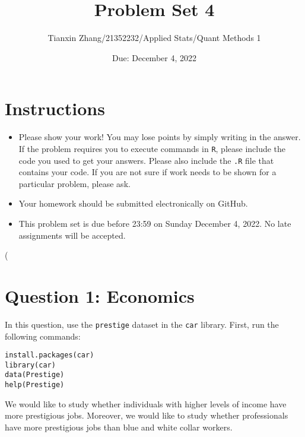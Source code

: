 \documentclass[12pt,letterpaper]{article}
\title{Problem Set 4}
\date{Due: December 4, 2022}
\author{Tianxin Zhang/21352232/Applied Stats/Quant Methods 1}
\begin{document}
	\maketitle
	\section*{Instructions}
	\begin{itemize}
		\item Please show your work! You may lose points by simply writing in the answer. If the problem requires you to execute commands in \texttt{R}, please include the code you used to get your answers. Please also include the \texttt{.R} file that contains your code. If you are not sure if work needs to be shown for a particular problem, please ask.
		\item Your homework should be submitted electronically on GitHub.
		\item This problem set is due before 23:59 on Sunday December 4, 2022. No late assignments will be accepted.
	\end{itemize}
\left( 


	\vspace{.5cm}
\section*{Question 1: Economics}
\vspace{.25cm}
\noindent 	
In this question, use the \texttt{prestige} dataset in the \texttt{car} library. First, run the following commands:

\begin{verbatim}
install.packages(car)
library(car)
data(Prestige)
help(Prestige)
\end{verbatim} 


\noindent We would like to study whether individuals with higher levels of income have more prestigious jobs. Moreover, we would like to study whether professionals have more prestigious jobs than blue and white collar workers.
\end{document}
